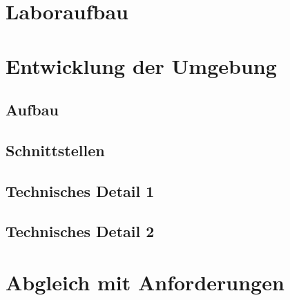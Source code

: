 	\section{Laboraufbau}
	\section{Entwicklung der Umgebung}
		\subsection{Aufbau}
		\subsection{Schnittstellen}
		\subsection{Technisches Detail 1}
		\subsection{Technisches Detail 2}
	\section{Abgleich mit Anforderungen}